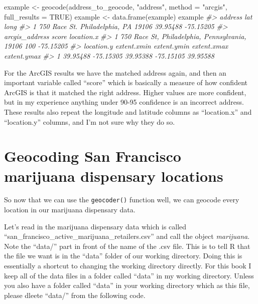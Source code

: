 \documentclass[
]{krantz}
\makeatletter
\newenvironment{Shaded}{\begin{snugshade}}{\end{snugshade}}
\newcommand{\AttributeTok}[1]{\textcolor[rgb]{0.61,0.61,0.61}{#1}}
\newcommand{\CommentTok}[1]{\textcolor[rgb]{0.37,0.37,0.37}{\textit{#1}}}
\newcommand{\ConstantTok}[1]{\textcolor[rgb]{0,0,0}{#1}}
\newcommand{\FunctionTok}[1]{\textcolor[rgb]{0,0,0}{#1}}
\newcommand{\NormalTok}[1]{#1}
\newcommand{\OtherTok}[1]{\textcolor[rgb]{0.37,0.37,0.37}{#1}}
\newcommand{\StringTok}[1]{\textcolor[rgb]{0.5,0.5,0.5}{#1}}
\newenvironment{kframe}{%
\medskip{}
\setlength{\fboxsep}{.8em}
 \def\at@end@of@kframe{}%
 \ifinner\ifhmode%
  \def\at@end@of@kframe{\end{minipage}}%
  \begin{minipage}{\columnwidth}%
 \fi\fi%
 \def\FrameCommand##1{\hskip\@totalleftmargin \hskip-\fboxsep
 \colorbox{shadecolor}{##1}\hskip-\fboxsep
     \hskip-\linewidth \hskip-\@totalleftmargin \hskip\columnwidth}%
 \MakeFramed {\advance\hsize-\width
   \@totalleftmargin\z@ \linewidth\hsize
   \@setminipage}}%
 {\par\unskip\endMakeFramed%
 \at@end@of@kframe}
\renewenvironment{Shaded}{\begin{kframe}}{\end{kframe}}
\makeatother
\begin{document}
\begin{Shaded}
\begin{Highlighting}[]
\NormalTok{example }\OtherTok{\textless{}{-}} \FunctionTok{geocode}\NormalTok{(address\_to\_geocode, }\StringTok{"address"}\NormalTok{, }\AttributeTok{method =} \StringTok{"arcgis"}\NormalTok{, }\AttributeTok{full\_results =} \ConstantTok{TRUE}\NormalTok{)}
\NormalTok{example }\OtherTok{\textless{}{-}} \FunctionTok{data.frame}\NormalTok{(example)}
\NormalTok{example}
\CommentTok{\#\textgreater{}                               address      lat      long}
\CommentTok{\#\textgreater{} 1 750 Race St. Philadelphia, PA 19106 39.95488 {-}75.15205}
\CommentTok{\#\textgreater{}                                   arcgis\_address score location.x}
\CommentTok{\#\textgreater{} 1 750 Race St, Philadelphia, Pennsylvania, 19106   100  {-}75.15205}
\CommentTok{\#\textgreater{}   location.y extent.xmin extent.ymin extent.xmax extent.ymax}
\CommentTok{\#\textgreater{} 1   39.95488   {-}75.15305    39.95388   {-}75.15105    39.95588}
\end{Highlighting}
\end{Shaded}

For the ArcGIS results we have the matched address again, and then an important variable called ``score'' which is basically a measure of how confident ArcGIS is that it matched the right address. Higher values are more confident, but in my experience anything under 90-95 confidence is an incorrect address. These results also repeat the longitude and latitude columns as ``location.x'' and ``location.y'' columns, and I'm not sure why they do so.

\hypertarget{geocoding-san-francisco-marijuana-dispensary-locations}{%
\section{Geocoding San Francisco marijuana dispensary locations}\label{geocoding-san-francisco-marijuana-dispensary-locations}}

So now that we can use the \texttt{geocoder()} function well, we can geocode every location in our marijuana dispensary data.

Let's read in the marijuana dispensary data which is called ``san\_francisco\_active\_marijuana\_retailers.csv'' and call the object \emph{marijuana}. Note the ``data/'' part in front of the name of the .csv file. This is to tell R that the file we want is in the ``data'' folder of our working directory. Doing this is essentially a shortcut to changing the working directory directly. For this book I keep all of the data files in a folder called ``data'' in my working directory. Unless you also have a folder called ``data'' in your working directory which as this file, please dleete ``data/'' from the following code.
\end{document}
